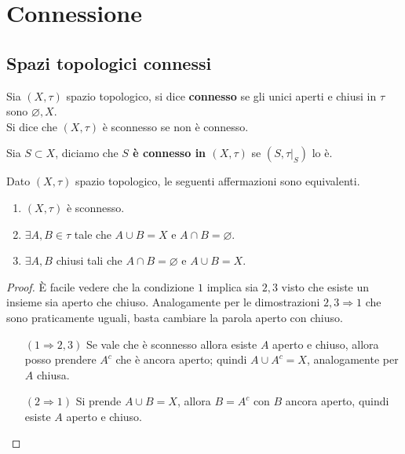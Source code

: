 \section{Connessione}
\subsection{\textcolor{TopGener}{\textbf{Spazi topologici connessi}}}



\begin{definition}
	Sia $(X, \tau)$ spazio topologico, si dice \textbf{connesso} se gli unici aperti e chiusi in $\tau$ sono $\varnothing, X$. \\ Si dice che $(X, \tau)$ è sconnesso se non è connesso. 
\end{definition} 

\begin{definition}
	Sia $S \subset X$, diciamo che \textbf{$S$ è connesso in $(X, \tau)$} se $(S, \tau|_S)$ lo è. 
\end{definition} 

\begin{theorem}
	Dato $(X, \tau)$ spazio topologico, le seguenti affermazioni sono equivalenti. 
	\begin{enumerate}
		\item $(X, \tau)$ è sconnesso. 
		\item $\exists A, B \in \tau$ tale che $A \cup B = X$ e $A \cap B = \varnothing$.
		\item $\exists A, B$ chiusi tali che $A\cap B = \varnothing$ e $A \cup B = X$.
	\end{enumerate}
\end{theorem} 
\begin{proof}
	È facile vedere che la condizione $1$ implica sia $2,3$ visto che esiste un insieme sia aperto che chiuso. Analogamente per le dimostrazioni $2,3 \Rightarrow 1$ che sono praticamente uguali, basta cambiare la parola aperto con chiuso. 
	\begin{enumerate}
		\item[$(1\Rightarrow 2,3)$] Se vale che è sconnesso allora esiste $A$ aperto e chiuso, allora posso prendere $A^c$ che è ancora aperto; quindi $A\cup A^c = X$, analogamente per $A$ chiusa. 
		\item[$(2 \Rightarrow 1)$] Si prende $A \cup B = X$, allora $B = A^c$ con $B$ ancora aperto, quindi esiste $A$ aperto e chiuso. 
	\end{enumerate}
\end{proof}

